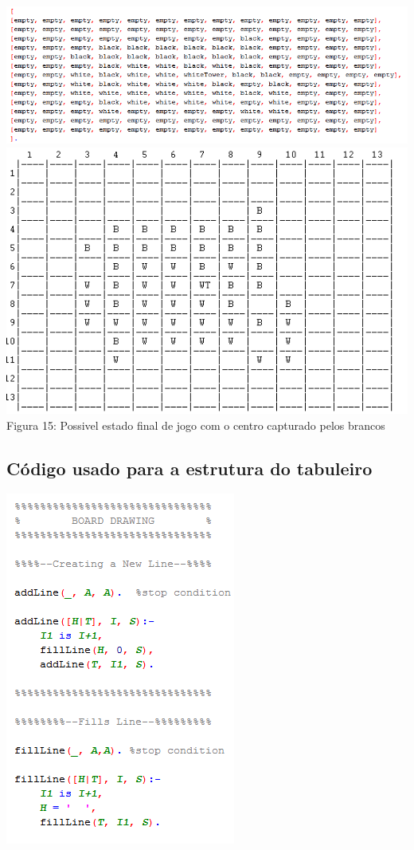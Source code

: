 \documentclass[a4paper]{article}
\begin{document}
\begin{center}
\hspace*{-2cm}\includegraphics[scale=0.85]{gameex3rep.png}\linebreak\linebreak
 \includegraphics[scale=0.9]{gameex3.png}\linebreak
Figura 15: Possivel estado final de jogo com o centro capturado pelos brancos \linebreak\linebreak
\end{center}

\subsection{Código usado para a estrutura do tabuleiro}

\includegraphics[scale=1]{code1.png}\linebreak
\end{document}
